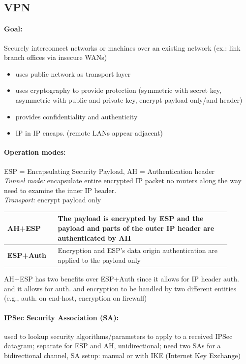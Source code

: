 \subsection{VPN}

\paragraph{Goal:}  Securely interconnect networks or machines over an existing network (ex.: link branch offices via insecure WANs) 
\begin{itemize}
\item uses public network as transport layer
\item uses cryptography to provide protection (symmetric with secret key, asymmetric with public and private key, encrypt payload only/and header) 
\item provides confidentiality and authenticity
\item IP in IP encaps. (remote LANs appear adjacent)
\end{itemize}

\paragraph{Operation modes:} ESP = Encapsulating Security Payload, AH = Authentication header \\
\emph{Tunnel mode:} encapsulate entire encrypted IP packet
no routers along the way need to examine
the inner IP header. \\ 
\emph{Transport:} encrypt payload only

\begin{tabular}{p{0.2\linewidth}p{0.7\linewidth}}
\textbf{AH+ESP} & The payload is encrypted by ESP and the payload and parts of the outer IP header are authenticated by AH \\
\hline
\textbf{ESP+Auth} & Encryption and ESP's data origin authentication are applied to the payload only \\
\end{tabular}

AH+ESP has two benefits over ESP+Auth since it allows for IP header auth. and it allows for auth. and encryption to be handled by two different entities (e.g., auth. on end-host, encryption on firewall)

\paragraph{IPSec Security Association (SA):} used to lookup security algorithms/parameters to apply
to a received IPSec datagram; separate for ESP and AH, unidirectional; need two SAs for a bidirectional channel, SA setup: manual or with IKE (Internet Key Exchange)

